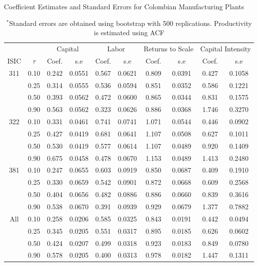 \documentclass[11pt]{article}
\begin{document}
\begin{table}[H]
\centering
\caption{Coefficient Estimates and Standard Errors for Colombian Manufacturing Plants}
\begin{tabular}{cccccccccc}
  \hline\hline & & \multicolumn{2}{c}{Capital}  & \multicolumn{2}{c}{Labor} & \multicolumn{2}{c}{Returns to Scale} & \multicolumn{2}{c}{Capital Intensity}\\ \cmidrule(lr){3-4} \cmidrule(lr){5-6} \cmidrule(lr){7-8} \cmidrule(lr){9-10}ISIC & $\tau$ & Coef. & s.e & Coef. & s.e & Coef. & s.e & Coef. & s.e \\ 
  \hline
311 & 0.10 & 0.242 & 0.0551 & 0.567 & 0.0621 & 0.809 & 0.0391 & 0.427 & 0.1058 \\ 
   & 0.25 & 0.314 & 0.0555 & 0.536 & 0.0594 & 0.851 & 0.0352 & 0.586 & 0.1221 \\ 
   & 0.50 & 0.393 & 0.0562 & 0.472 & 0.0600 & 0.865 & 0.0344 & 0.831 & 0.1575 \\ 
   & 0.90 & 0.563 & 0.0562 & 0.323 & 0.0626 & 0.886 & 0.0368 & 1.746 & 0.3270 \\ 
  322 & 0.10 & 0.331 & 0.0461 & 0.741 & 0.0741 & 1.071 & 0.0544 & 0.446 & 0.0902 \\ 
   & 0.25 & 0.427 & 0.0419 & 0.681 & 0.0641 & 1.107 & 0.0508 & 0.627 & 0.1011 \\ 
   & 0.50 & 0.530 & 0.0419 & 0.577 & 0.0614 & 1.107 & 0.0489 & 0.920 & 0.1409 \\ 
   & 0.90 & 0.675 & 0.0458 & 0.478 & 0.0670 & 1.153 & 0.0489 & 1.413 & 0.2480 \\ 
  381 & 0.10 & 0.247 & 0.0655 & 0.603 & 0.0919 & 0.850 & 0.0687 & 0.409 & 0.1910 \\ 
   & 0.25 & 0.330 & 0.0659 & 0.542 & 0.0901 & 0.872 & 0.0668 & 0.609 & 0.2568 \\ 
   & 0.50 & 0.404 & 0.0656 & 0.482 & 0.0886 & 0.886 & 0.0660 & 0.839 & 0.3616 \\ 
   & 0.90 & 0.538 & 0.0670 & 0.391 & 0.0939 & 0.929 & 0.0679 & 1.377 & 0.7882 \\ 
  All & 0.10 & 0.258 & 0.0206 & 0.585 & 0.0325 & 0.843 & 0.0191 & 0.442 & 0.0494 \\ 
   & 0.25 & 0.345 & 0.0205 & 0.551 & 0.0317 & 0.895 & 0.0185 & 0.626 & 0.0602 \\ 
   & 0.50 & 0.424 & 0.0207 & 0.499 & 0.0318 & 0.923 & 0.0183 & 0.849 & 0.0780 \\ 
   & 0.90 & 0.578 & 0.0205 & 0.400 & 0.0313 & 0.978 & 0.0182 & 1.447 & 0.1311 \\ 
   \hline
\end{tabular}
\caption*{\footnotesize $^{*}$Standard errors are obtained using bootstrap with 500 replications. Productivity is estimated using ACF}
\label{COLestACF}
\end{table}
\end{document}

